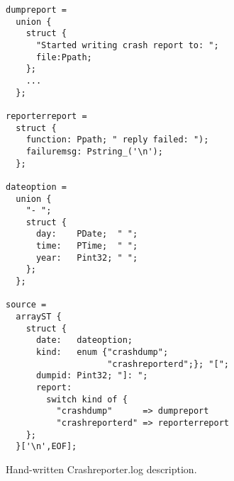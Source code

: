 \begin{figure}[t]
\begin{small}
\begin{verbatim}
dumpreport =
  union {
    struct {
      "Started writing crash report to: "; 
      file:Ppath;
    };
    ...
  };

reporterreport =
  struct {
    function: Ppath; " reply failed: ");
    failuremsg: Pstring_('\n'); 
  };

dateoption = 
  union {
    "- ";
    struct {
      day:    PDate;  " ";
      time:   PTime;  " ";
      year:   Pint32; " ";
    };
  };

source =
  arrayST {
    struct {
      date:   dateoption;
      kind:   enum {"crashdump"; 
                    "crashreporterd";}; "[";
      dumpid: Pint32; "]: ";
      report: 
        switch kind of {
          "crashdump"      => dumpreport
          "crashreporterd" => reporterreport
    };
  }['\n',EOF];
\end{verbatim}
\end{small}
\caption{Hand-written \ir{} Crashreporter.log description.}
\label{fig:crashreporter:ir}
\end{figure}



